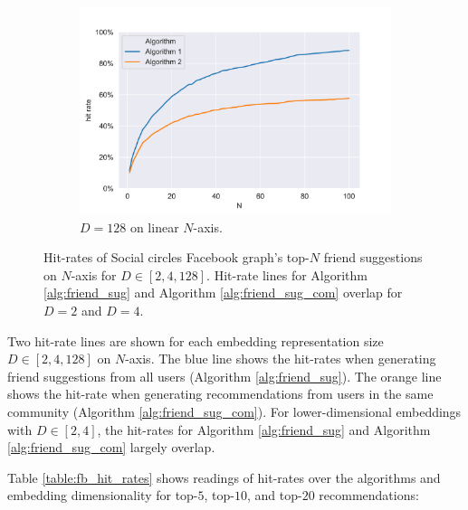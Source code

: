 \documentclass[conference]{IEEEtran}
\begin{document}
\begin{figure}[htbp]
    \begin{subfigure}{.48\textwidth}
        \centering
        \includegraphics[width=1\linewidth]{images/fb/hit_rates_d-128.png}
        \caption{$D=128$ on linear $N$-axis.}
        \label{fig:fb_hit_rates_d128}
    \end{subfigure}%

    \caption{Hit-rates of Social circles Facebook graph's top-$N$ friend suggestions on $N$-axis for $D \in [2,4,128]$. Hit-rate lines for Algorithm \ref{alg:friend_sug} and Algorithm \ref{alg:friend_sug_com} overlap for $D=2$ and $D=4$.}
    \label{fig:fb_hit_rates}
\end{figure}

Two hit-rate lines are shown for each embedding representation size $D \in [2,4,128]$ on $N$-axis. The blue line shows the hit-rates when generating friend suggestions from all users (Algorithm \ref{alg:friend_sug}). The orange line shows the hit-rate when generating recommendations from users in the same community (Algorithm \ref{alg:friend_sug_com}). For lower-dimensional embeddings with $D \in [2,4]$, the hit-rates for Algorithm \ref{alg:friend_sug} and Algorithm \ref{alg:friend_sug_com} largely overlap.

Table \ref{table:fb_hit_rates} shows readings of hit-rates over the algorithms and embedding dimensionality for top-$5$, top-$10$, and top-$20$ recommendations:
\end{document}
